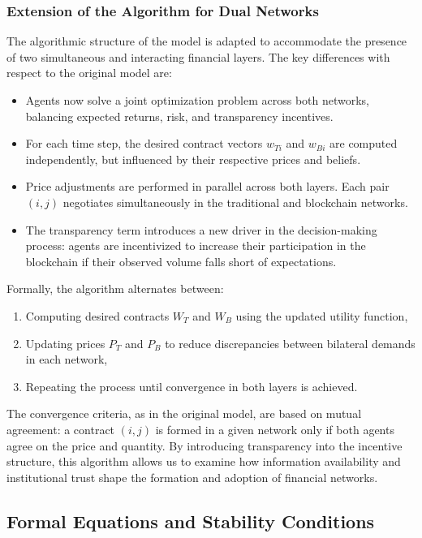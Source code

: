 \subsubsection{Extension of the Algorithm for Dual Networks}

The algorithmic structure of the model is adapted to accommodate the presence of two simultaneous and interacting financial layers. The key differences with respect to the original model are:

\begin{itemize}
    \item Agents now solve a joint optimization problem across both networks, balancing expected returns, risk, and transparency incentives.
    \item For each time step, the desired contract vectors \( w_{Ti} \) and \( w_{Bi} \) are computed independently, but influenced by their respective prices and beliefs.
    \item Price adjustments are performed in parallel across both layers. Each pair \( (i, j) \) negotiates simultaneously in the traditional and blockchain networks.
    \item The transparency term introduces a new driver in the decision-making process: agents are incentivized to increase their participation in the blockchain if their observed volume falls short of expectations.
\end{itemize}

Formally, the algorithm alternates between:
\begin{enumerate}
    \item Computing desired contracts \( W_T \) and \( W_B \) using the updated utility function,
    \item Updating prices \( P_T \) and \( P_B \) to reduce discrepancies between bilateral demands in each network,
    \item Repeating the process until convergence in both layers is achieved.
\end{enumerate}

The convergence criteria, as in the original model, are based on mutual agreement: a contract \( (i, j) \) is formed in a given network only if both agents agree on the price and quantity. By introducing transparency into the incentive structure, this algorithm allows us to examine how information availability and institutional trust shape the formation and adoption of financial networks.


\subsection{Formal Equations and Stability Conditions}

